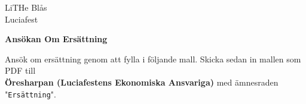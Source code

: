 
\begin{flushright}
    \Large{LiTHe Blås \\
    Luciafest}
\end{flushright}

\vspace{4cm} %

\noindent\textbf{\LARGE Ansökan Om Ersättning}

\vspace{0.5cm}

\noindent Ansök om ersättning genom att fylla i följande mall. Skicka sedan in mallen som PDF till \\
\textbf{Öresharpan (Luciafestens Ekonomiska Ansvariga)} med ämnesraden "\texttt{Ersättning}".

\vspace{0.7cm}

